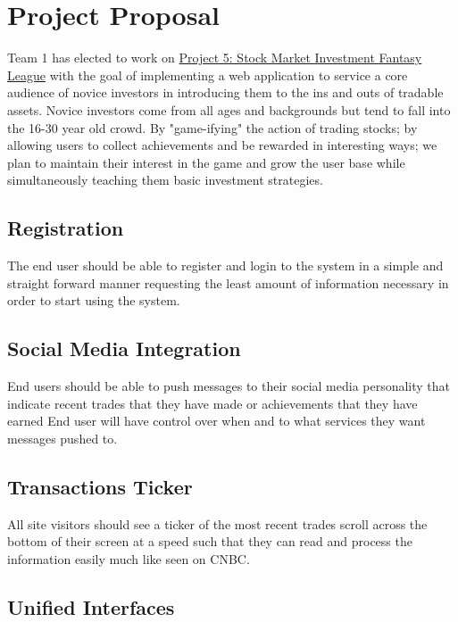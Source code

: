 \documentclass[11pt,letterpaper,oneside]{memoir}
\begin{document}
\chapter{Project Proposal}
\label{proposal}
Team 1 has elected to work on
\href{http://ece.rutgers.edu/~marsic/books/SE/projects/}
{Project 5: Stock Market Investment Fantasy League} with the goal of
implementing a web application to service a core audience of novice investors
in introducing them to the ins and outs of tradable assets.  Novice investors
come from all ages and backgrounds but tend to fall into the 16-30 year old
crowd. By "game-ifying" the action of trading stocks; by allowing users to
collect achievements and be rewarded in interesting ways; we plan to maintain
their interest in the game and grow the user base while simultaneously teaching
them basic investment strategies.

\section{Registration}

The end user should be able to register and login to the system in a simple and
straight forward manner requesting the least amount of information necessary in
order to start using the system.

\section{Social Media Integration}

End users should be able to push messages to their social media personality that
indicate recent trades that they have made or achievements that they have earned
End user will have control over when and to what services they want messages
pushed to.

\section{Transactions Ticker}

All site visitors should see a ticker of the most recent trades scroll across
the bottom of their screen at a speed such that they can read and process the
information easily much like seen on CNBC.

\section{Unified Interfaces}
\end{document}
